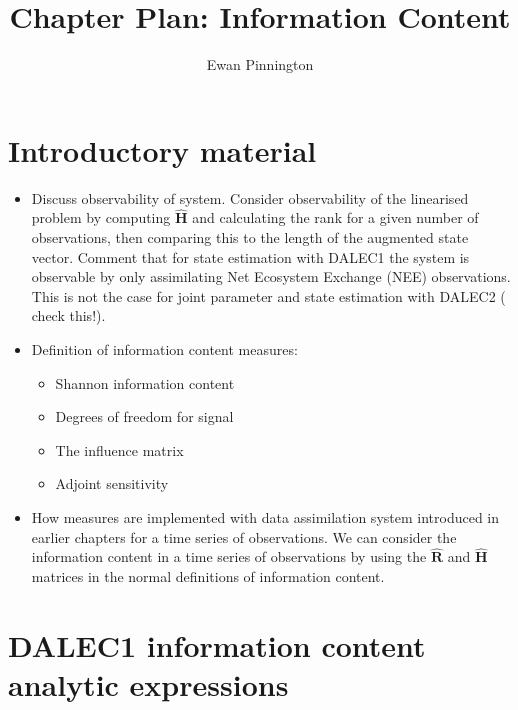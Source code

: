 \documentclass[11pt]{article}
\title{Chapter Plan: Information Content}
\author{Ewan Pinnington}
\begin{document}
\maketitle

\section{Introductory material}

\begin{itemize}
\item Discuss observability of system. Consider observability of the linearised problem by computing $\hat{\textbf{H}}$ and calculating the rank for a given number of observations, then comparing this to the length of the augmented state vector. Comment that for state estimation with DALEC1 the system is observable by only assimilating Net Ecosystem Exchange (NEE) observations. This is not the case for joint parameter and state estimation with DALEC2 ({\color{red} check this!}).
\item Definition of information content measures:
\begin{itemize}
\item Shannon information content \citep{rodgers2000inverse} 
\item Degrees of freedom for signal \citep{fowler2011measures}
\item The influence matrix \citep{Cardinali2004}
\item Adjoint sensitivity \citep{Langland2004}
\end{itemize}
\item How measures are implemented with data assimilation system introduced in earlier chapters for a time series of observations. We can consider the information content in a time series of observations by using the $\hat{\textbf{R}}$ and $\hat{\textbf{H}}$ matrices in the normal definitions of information content.

\end{itemize}

\section{DALEC1 information content analytic expressions} \label{sec:dalec1}
\end{document}
